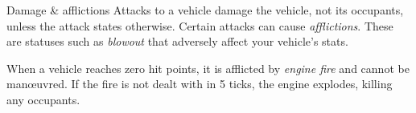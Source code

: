 
\begin{abstractsection}{Damage \& afflictions}
Attacks to a vehicle damage the vehicle, not its occupants, unless the attack states otherwise. Certain attacks can cause \emph{afflictions}. These are statuses such as \emph{blowout} that adversely affect your vehicle's stats.

When a vehicle reaches zero hit points, it is afflicted by \emph{engine fire} and cannot be man\oe{}uvred. If the fire is not dealt with in 5 ticks, the engine explodes, killing any occupants.
\end{abstractsection}
